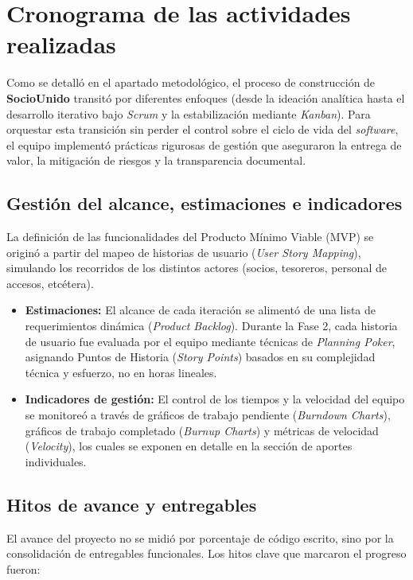 \section{Cronograma de las actividades realizadas}

Como se detalló en el apartado metodológico, el proceso de construcción de \textbf{SocioUnido} transitó por diferentes enfoques (desde la ideación analítica hasta el desarrollo iterativo bajo \textit{Scrum} y la estabilización mediante \textit{Kanban}). Para orquestar esta transición sin perder el control sobre el ciclo de vida del \textit{software}, el equipo implementó prácticas rigurosas de gestión que aseguraron la entrega de valor, la mitigación de riesgos y la transparencia documental.

\subsection{Gestión del alcance, estimaciones e indicadores}

La definición de las funcionalidades del Producto Mínimo Viable (MVP) se originó a partir del mapeo de historias de usuario (\textit{User Story Mapping}), simulando los recorridos de los distintos actores (socios, tesoreros, personal de accesos, etcétera). 

\begin{itemize}
    \item \textbf{Estimaciones:} El alcance de cada iteración se alimentó de una lista de requerimientos dinámica (\textit{Product Backlog}). Durante la Fase 2, cada historia de usuario fue evaluada por el equipo mediante técnicas de \textit{Planning Poker}, asignando Puntos de Historia (\textit{Story Points}) basados en su complejidad técnica y esfuerzo, no en horas lineales.
    \item \textbf{Indicadores de gestión:} El control de los tiempos y la velocidad del equipo se monitoreó a través de gráficos de trabajo pendiente (\textit{Burndown Charts}), gráficos de trabajo completado (\textit{Burnup Charts}) y métricas de velocidad (\textit{Velocity}), los cuales se exponen en detalle en la sección de aportes individuales.
\end{itemize}

\subsection{Hitos de avance y entregables}

El avance del proyecto no se midió por porcentaje de código escrito, sino por la consolidación de entregables funcionales. Los hitos clave que marcaron el progreso fueron:

